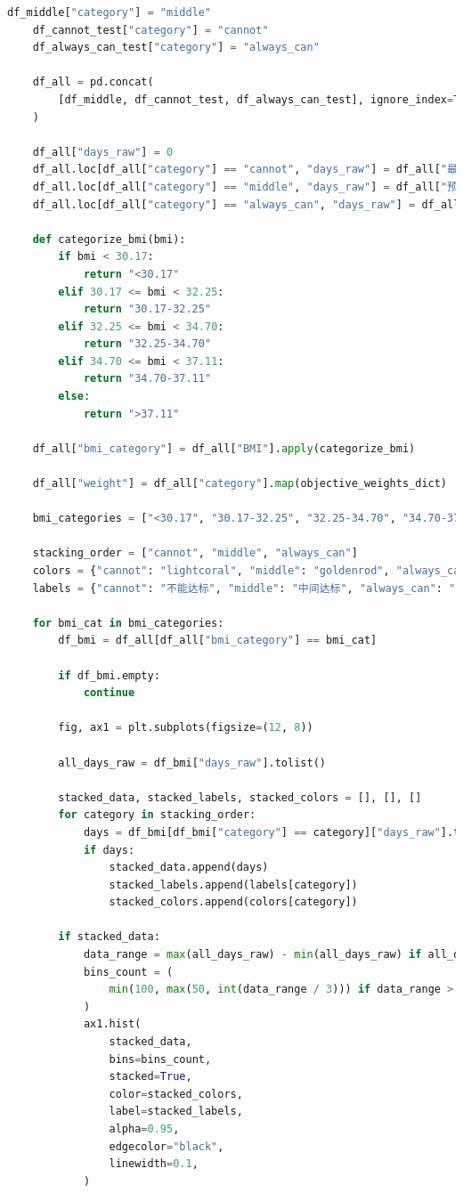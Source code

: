 \documentclass{article}
\begin{document}
\begin{lstlisting}[language=Python, caption={C(2)(权重计算).py}, label={code:python_example}]
    df_middle["category"] = "middle"
    df_cannot_test["category"] = "cannot"
    df_always_can_test["category"] = "always_can"

    df_all = pd.concat(
        [df_middle, df_cannot_test, df_always_can_test], ignore_index=True
    )

    df_all["days_raw"] = 0
    df_all.loc[df_all["category"] == "cannot", "days_raw"] = df_all["最晚不达标天数"]
    df_all.loc[df_all["category"] == "middle", "days_raw"] = df_all["预测达标天数"]
    df_all.loc[df_all["category"] == "always_can", "days_raw"] = df_all["最早达标天数"]

    def categorize_bmi(bmi):
        if bmi < 30.17:
            return "<30.17"
        elif 30.17 <= bmi < 32.25:
            return "30.17-32.25"
        elif 32.25 <= bmi < 34.70:
            return "32.25-34.70"
        elif 34.70 <= bmi < 37.11:
            return "34.70-37.11"
        else:
            return ">37.11"

    df_all["bmi_category"] = df_all["BMI"].apply(categorize_bmi)

    df_all["weight"] = df_all["category"].map(objective_weights_dict)

    bmi_categories = ["<30.17", "30.17-32.25", "32.25-34.70", "34.70-37.11", ">37.11"]

    stacking_order = ["cannot", "middle", "always_can"]
    colors = {"cannot": "lightcoral", "middle": "goldenrod", "always_can": "seagreen"}
    labels = {"cannot": "不能达标", "middle": "中间达标", "always_can": "始终达标"}

    for bmi_cat in bmi_categories:
        df_bmi = df_all[df_all["bmi_category"] == bmi_cat]

        if df_bmi.empty:
            continue

        fig, ax1 = plt.subplots(figsize=(12, 8))

        all_days_raw = df_bmi["days_raw"].tolist()

        stacked_data, stacked_labels, stacked_colors = [], [], []
        for category in stacking_order:
            days = df_bmi[df_bmi["category"] == category]["days_raw"].tolist()
            if days:
                stacked_data.append(days)
                stacked_labels.append(labels[category])
                stacked_colors.append(colors[category])

        if stacked_data:
            data_range = max(all_days_raw) - min(all_days_raw) if all_days_raw else 0
            bins_count = (
                min(100, max(50, int(data_range / 3))) if data_range > 0 else 50
            )
            ax1.hist(
                stacked_data,
                bins=bins_count,
                stacked=True,
                color=stacked_colors,
                label=stacked_labels,
                alpha=0.95,
                edgecolor="black",
                linewidth=0.1,
            )


\end{lstlisting}
\end{document}
